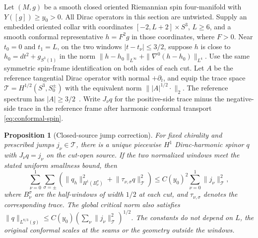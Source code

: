 \documentclass[11pt]{article}
\numberwithin{equation}{section}
\newtheorem{proposition}[theorem]{Proposition}
\newcommand{\abs}[1]{\lvert #1\rvert}
\newcommand{\norm}[1]{\lVert #1\rVert}
\begin{document}
Let \((M,g)\) be a smooth closed oriented Riemannian spin four-manifold
with \(Y([g])\ge y_0>0\). All Dirac operators in this section are
untwisted. Supply an embedded oriented collar with coordinates
\([-2,L+2]\times S^3\), \(L\ge6\), and a smooth conformal representative
\(h=F^2g\) in those coordinates, where \(F>0\). Near \(t_0=0\) and
\(t_1=L\), on the two windows \(|t-t_\nu|\le3/2\), suppose
\(h\) is close to \(h_0=dt^2+g_{S^3(1)}\) in the norm
\(\|h-h_0\|_{L^\infty}+\|\nabla^0(h-h_0)\|_{L^4}\).
Use the same symmetric spin-frame identification on both sides of
each cut. Let \(A\) be the reference tangential Dirac operator with
normal \(+\partial_t\), and equip the trace space
\(\mathcal T=H^{1/2}(S^3,S^\pm_0)\) with the equivalent norm
\(\||A|^{1/2}\cdot\|_2\). The reference spectrum has
\(\abs{A}\ge3/2\)~\cite{Bar1996SphereDirac}. Write
\(J_\nu q\) for the positive-side trace minus the negative-side trace
in the reference frame after harmonic conformal transport
\eqref{eq:conformal-spin}.

\begin{proposition}[Closed-source jump correction]\label{prop:dirac-jumps}
For fixed chirality and prescribed jumps \(j_\nu\in\mathcal T\),
there is a unique piecewise \(H^1\) Dirac-harmonic spinor \(q\) with
\(J_\nu q=j_\nu\) on the cut-open source. If the two normalized
windows meet the stated uniform smallness bound, then
\begin{equation}\label{eq:dirac-jumps}
 \sum_{\nu=0}^1\sum_{\sigma=\pm}
 \left(\norm{q_h}_{H^1(B_\nu^\sigma)}^2+
             \norm{\tau_{\nu,\sigma}q}_{\mathcal T}^2\right)
 \le C(y_0)^2\sum_{\nu=0}^1\norm{j_\nu}_{\mathcal T}^2 ,
\end{equation}
where \(B_\nu^\sigma\) are the half-windows of width \(1/2\) at each
cut, and \(\tau_{\nu,\sigma}\) denotes the corresponding trace.
The global critical norm also satisfies
\(\|q\|_{L^{8/3}(g)}\le C(y_0)
(\sum_\nu\|j_\nu\|_{\mathcal T}^2)^{1/2}\).
The constants do not depend on \(L\), the original conformal scales
at the seams or the geometry outside the windows.
\end{proposition}
\end{document}
